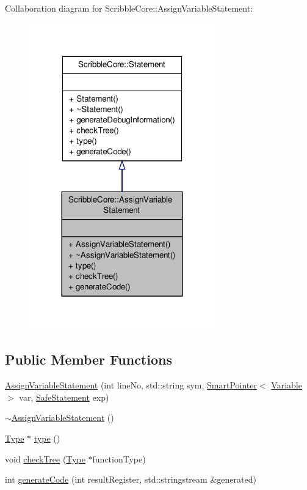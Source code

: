 Collaboration diagram for Scribble\-Core\-:\-:Assign\-Variable\-Statement\-:
\nopagebreak
\begin{figure}[H]
\begin{center}
\leavevmode
\includegraphics[width=228pt]{class_scribble_core_1_1_assign_variable_statement__coll__graph}
\end{center}
\end{figure}
\subsection*{Public Member Functions}
\begin{DoxyCompactItemize}
\item 
\hyperlink{class_scribble_core_1_1_assign_variable_statement_a4409d9bc843516435a02a9ce55041346}{Assign\-Variable\-Statement} (int line\-No, std\-::string sym, \hyperlink{_smart_pointer_8hpp_afdd8d4ba81c3fcbdeacf1dafba2accfb}{Smart\-Pointer}$<$ \hyperlink{class_scribble_core_1_1_variable}{Variable} $>$ var, \hyperlink{namespace_scribble_core_a2ad5bf236bc9164cb56f564685f15a11}{Safe\-Statement} exp)
\item 
\hyperlink{class_scribble_core_1_1_assign_variable_statement_a9ee47635ce2fe9ea191955220f2dbb77}{$\sim$\-Assign\-Variable\-Statement} ()
\item 
\hyperlink{class_scribble_core_1_1_type}{Type} $\ast$ \hyperlink{class_scribble_core_1_1_assign_variable_statement_a809f7220af1536d0912a68e6880e5c81}{type} ()
\item 
void \hyperlink{class_scribble_core_1_1_assign_variable_statement_a9ad4d49c7f0691aad680cb30711cd149}{check\-Tree} (\hyperlink{class_scribble_core_1_1_type}{Type} $\ast$function\-Type)
\item 
int \hyperlink{class_scribble_core_1_1_assign_variable_statement_a2cd7a3d55227d0feaf7b622c02b521cb}{generate\-Code} (int result\-Register, std\-::stringstream \&generated)
\end{DoxyCompactItemize}


